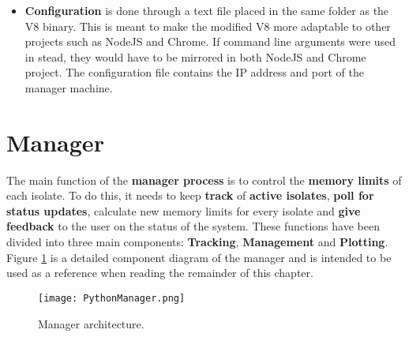 \documentclass{l4proj}
\begin{document}
\begin{itemize}
\item \textbf{Configuration} is done through a text file placed in the same folder as the V8 binary. This is meant to make the modified V8 more adaptable to other projects such as NodeJS and Chrome. If command line arguments were used in stead, they would have to be mirrored in both NodeJS and Chrome project. The configuration file contains the IP address and port of the manager machine.
\end{itemize}
\section{Manager}
\hspace*{3em} The main function of the \textbf{manager process} is to control the \textbf{memory limits} of each isolate. To do this, it needs to keep \textbf{track} of \textbf{active isolates}, \textbf{poll for status updates}, calculate new memory limits for every isolate and \textbf{give feedback} to the user on the status of the system. These functions have been divided into three main components: \textbf{Tracking}, \textbf{Management} and \textbf{Plotting}. Figure \ref{managerdetail} is a detailed component diagram of the manager and is intended to be used as a reference when reading the remainder of this chapter.
\begin{figure}[!ht]
  \centering
    \texttt{[image: PythonManager.png]}
  \caption{Manager architecture.}
    \label{managerdetail}
\end{figure}
\end{document}
